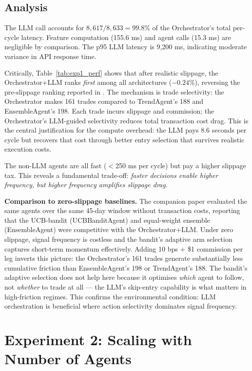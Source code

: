 \documentclass[10pt,conference]{IEEEtran}
\begin{document}
\subsection{Analysis}

The LLM call accounts for $8{,}617 / 8{,}633 = \mathbf{99.8\%}$ of the Orchestrator's total per-cycle latency. Feature computation (155.6 ms) and agent calls (15.3 ms) are negligible by comparison. The p95 LLM latency is 9,200 ms, indicating moderate variance in API response time.

Critically, Table~\ref{tab:exp1_perf} shows that after realistic slippage, the Orchestrator+LLM ranks \textit{first} among all architectures ($-0.24\%$), reversing the pre-slippage ranking reported in \cite{companion}. The mechanism is trade selectivity: the Orchestrator makes 161 trades compared to TrendAgent's 188 and EnsembleAgent's 198. Each trade incurs slippage and commission; the Orchestrator's LLM-guided selectivity reduces total transaction cost drag. This is the central justification for the compute overhead: the LLM pays 8.6 seconds per cycle but recovers that cost through better entry selection that survives realistic execution costs.

The non-LLM agents are all fast ($<$250 ms per cycle) but pay a higher slippage tax. This reveals a fundamental trade-off: \textit{faster decisions enable higher frequency, but higher frequency amplifies slippage drag.}

\textbf{Comparison to zero-slippage baselines.} The companion paper \cite{companion} evaluated the same agents over the same 45-day window without transaction costs, reporting that the UCB-bandit (UCBBanditAgent) and equal-weight ensemble (EnsembleAgent) were competitive with the Orchestrator+LLM. Under zero slippage, signal frequency is costless and the bandit's adaptive arm selection captures short-term momentum effectively. Adding 10 bps + \$1 commission per leg inverts this picture: the Orchestrator's 161 trades generate substantially less cumulative friction than EnsembleAgent's 198 or TrendAgent's 188. The bandit's adaptive selection does not help here because it optimises \textit{which} agent to follow, not \textit{whether} to trade at all --- the LLM's skip-entry capability is what matters in high-friction regimes. This confirms the environmental condition: LLM orchestration is beneficial where action selectivity dominates signal frequency.


\section{Experiment 2: Scaling with Number of Agents}
\label{sec:exp2}
\end{document}
